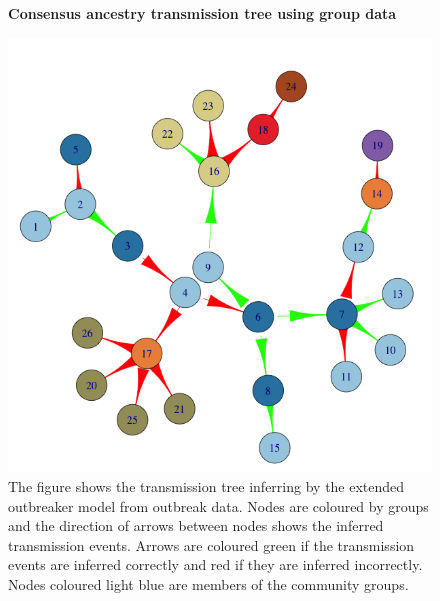 \documentclass[11pt,a4paper]{report}
\begin{document}
\begin{figure}[h!]
\centering
{\bf Consensus ancestry transmission tree using group data}
\caption{The figure shows the transmission tree inferring by the extended outbreaker model from outbreak data. Nodes are coloured by groups and the direction of arrows between nodes shows the inferred transmission events. Arrows are coloured green if the transmission events are inferred correctly and red if they are inferred incorrectly. Nodes coloured light blue are members of the community groups.}
\includegraphics[scale=0.5]{tree_with_grps.png}
\end{figure}
\end{document}
